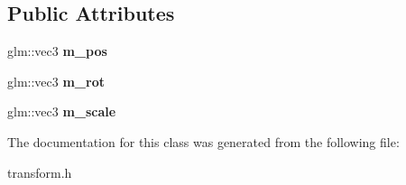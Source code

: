 \subsection*{Public Attributes}
\begin{DoxyCompactItemize}
\item 
glm\+::vec3 {\bfseries m\+\_\+pos}\hypertarget{class_transform_a4fc3e74f53c30bfa44a96fbc4140b3f3}{}\label{class_transform_a4fc3e74f53c30bfa44a96fbc4140b3f3}

\item 
glm\+::vec3 {\bfseries m\+\_\+rot}\hypertarget{class_transform_a1828f07ae48b9afec249023cd9de8c78}{}\label{class_transform_a1828f07ae48b9afec249023cd9de8c78}

\item 
glm\+::vec3 {\bfseries m\+\_\+scale}\hypertarget{class_transform_aefc54a7741af00958612ed0f9596b702}{}\label{class_transform_aefc54a7741af00958612ed0f9596b702}

\end{DoxyCompactItemize}


The documentation for this class was generated from the following file\+:\begin{DoxyCompactItemize}
\item 
transform.\+h\end{DoxyCompactItemize}
